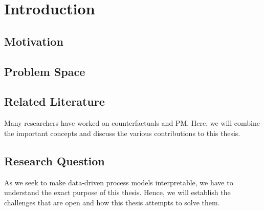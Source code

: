 \documentclass[12pt,a4paper]{report}
\begin{document}




\tableofcontents
\printglossary[type=acronym, title=List of terms, toctitle=List of terms]


\chapter{Introduction}
\label{sec:intro}

\section{Motivation}
\label{sec:motivation}


\section{Problem Space}
\label{sec:challenges}


% 

\section{Related Literature}
\label{sec:literature}
Many researchers have worked on counterfactuals and \Gls{PM}. Here, we will combine the important concepts and discuss the various contributions to this thesis.



\section{Research Question}
\label{sec:rq}
As we seek to make data-driven process models interpretable, we have to understand the exact purpose of this thesis. Hence, we will establish the challenges that are open and how this thesis attempts to solve them. 



\end{document}
